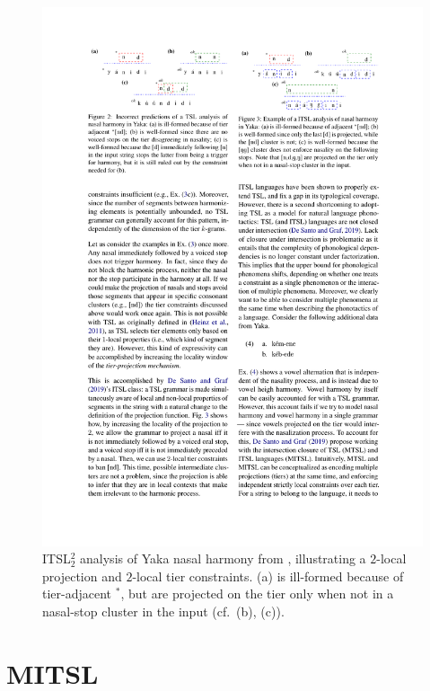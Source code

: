 \documentclass[11pt]{article}
\begin{document}
                   \begin{figure}[htbp]
    \centering
\includegraphics[width=  1\linewidth]{yaka.pdf}
\caption{ITSL$_2^2$ analysis of Yaka nasal
harmony from \citep{de2021learning}, illustrating a $2$-local projection and $2$-local tier constraints. (a) is ill-formed because of tier-adjacent $^*$\textipa{[nd]}, but \textipa{[n,d,g,N]} are projected on the tier only when not in a nasal-stop cluster in the input (cf.\ (b), (c)).}
\label{fig:yaka}
\end{figure}
    
\section{MITSL}
\end{document}

